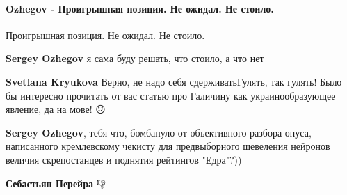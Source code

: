  
 
 
 
 
\paragraph{Ozhegov - Проигрышная позиция. Не ожидал. Не стоило.}

\begin{itemize}
 
Проигрышная позиция.
Не ожидал. Не стоило. 

\begin{itemize}
 
\textbf{Sergey Ozhegov} я сама буду решать, что стоило, а что нет

 
\textbf{Svetlana Kryukova} Верно, не надо себя сдерживать\Smiley[1.0][yellow] Гулять, так гулять! Было бы интересно прочитать от вас статью про Галичину как украинообразующее явление, да на мове! 🙃

 
\textbf{Sergey Ozhegov}, тебя что, бомбануло от объективного разбора опуса, написанного кремлевскому чекисту для предвыборного шевеления нейронов величия скрепостанцев и поднятия рейтингов "Едра"?))

 
\textbf{Себастьян Перейра} 👎


\end{itemize}
\end{itemize}
